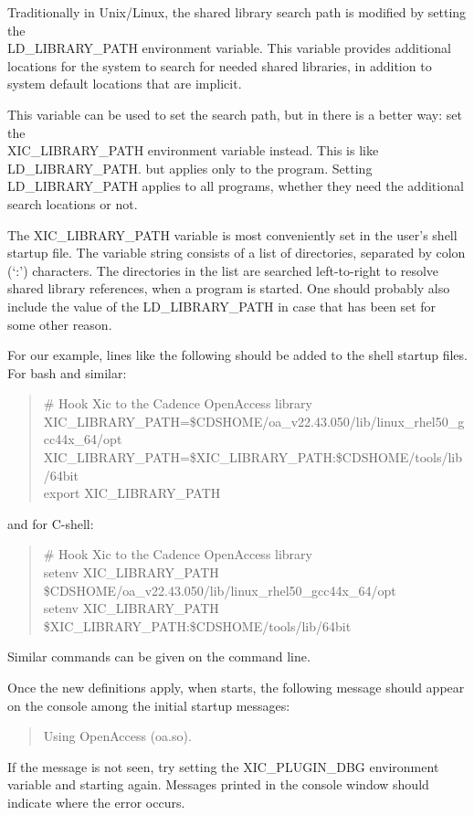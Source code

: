 Traditionally in Unix/Linux, the shared library search path is
modified by setting the\\ {\et LD\_LIBRARY\_PATH} environment variable. 
This variable provides additional locations for the system to search
for needed shared libraries, in addition to system default locations
that are implicit.

This variable can be used to set the search path, but in {\Xic} there
is a better way:  set the\\ {\et XIC\_LIBRARY\_PATH} environment
variable instead.  This is like {\et LD\_LIBRARY\_PATH}.  but applies
only to the {\Xic} program.  Setting {\et LD\_LIBRARY\_PATH} applies
to all programs, whether they need the additional search locations or
not.

The {\et XIC\_LIBRARY\_PATH} variable is most conveniently set in the
user's shell startup file.  The variable string consists of a list of
directories, separated by colon (`{\vt :}') characters.  The
directories in the list are searched left-to-right to resolve shared
library references, when a program is started.  One should probably
also include the value of the {\et LD\_LIBRARY\_PATH} in case that has
been set for some other reason.

For our example, lines like the following should be added to the shell
startup files.  For {\vt bash} and similar:
\begin{quote}\vt
\# Hook Xic to the Cadence OpenAccess library\\
XIC\_LIBRARY\_PATH=\$CDSHOME/oa\_v22.43.050/lib/linux\_rhel50\_gcc44x\_64/opt\\
XIC\_LIBRARY\_PATH=\$XIC\_LIBRARY\_PATH:\$CDSHOME/tools/lib/64bit\\
export XIC\_LIBRARY\_PATH
\end{quote}
and for C-shell:
\begin{quote}\vt
\# Hook Xic to the Cadence OpenAccess library\\
setenv XIC\_LIBRARY\_PATH \$CDSHOME/oa\_v22.43.050/lib/linux\_rhel50\_gcc44x\_64/opt\\
setenv XIC\_LIBRARY\_PATH \$XIC\_LIBRARY\_PATH:\$CDSHOME/tools/lib/64bit
\end{quote}
Similar commands can be given on the command line.

Once the new definitions apply, when {\Xic} starts, the following
message should appear on the console among the initial startup
messages:
\begin{quote}
\vt Using OpenAccess (oa.so).
\end{quote}
If the message is not seen, try setting the {\et XIC\_PLUGIN\_DBG}
environment variable and starting {\Xic} again.  Messages printed in
the console window should indicate where the error occurs.

